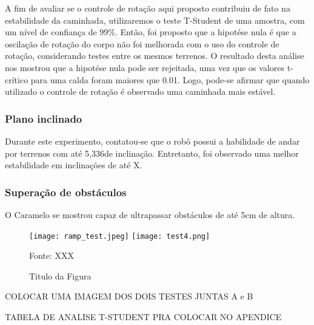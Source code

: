 \documentclass[../main.tex]{subfiles}
\begin{document}
  A fim de avaliar se o controle de rotação aqui proposto contribuiu de fato na estabilidade da caminhada, utilizaremos o teste T-Student de uma amostra, com um nível de confiança de 99\%. Então, foi proposto que a hipotése nula é que a oscilação de rotação do corpo não foi melhorada com o uso do controle de rotação, considerando testes entre os mesmos terrenos. O resultado desta análise nos mostrou que a hipotése nula pode ser rejeitada, uma vez que os valores t-crítico para uma calda foram maiores que 0.01. Logo, pode-se afirmar que quando utilizado o controle de rotação é observado uma caminhada mais estável.
  
  \subsubsection{Plano inclinado}
  Durante este experimento, contatou-se que o robô possui a habilidade de andar por terrenos com até 5,336\degree de inclinação. Entretanto, foi observado uma melhor estabilidade em inclinações de até X\degree. 
  
  \subsubsection{Superação de obstáculos}
  O Caramelo se mostrou capaz de ultrapassar obstáculos de até 5cm de altura. 

  \begin{figure}[h]
    \centering
    \caption{Titulo da Figura}
    \texttt{[image: ramp\_test.jpeg]}
    \texttt{[image: test4.png]}

    Fonte: XXX
    \label{fig:grafico_trajetoria_xyz}
  \end{figure}


  COLOCAR UMA IMAGEM DOS DOIS TESTES JUNTAS A e B

  TABELA DE ANALISE T-STUDENT PRA COLOCAR NO APENDICE 



   
\end{document}
